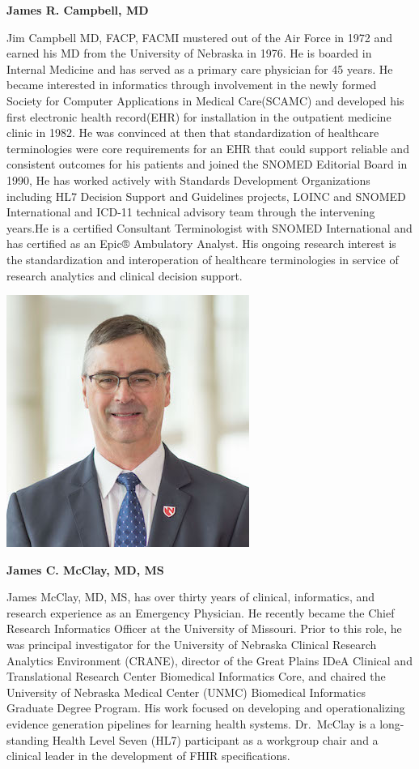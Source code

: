 \documentclass[
]{journal}
\begin{document}
\textbf{James R. Campbell, MD}

Jim Campbell MD, FACP, FACMI mustered out of the Air Force in 1972 and earned his MD from the University of Nebraska in 1976. He is boarded in Internal Medicine and has served as a primary care physician for 45 years. He became interested in informatics through involvement in the newly formed Society for Computer Applications in Medical Care(SCAMC) and developed his first electronic health record(EHR) for installation in the outpatient medicine clinic in 1982. He was convinced at then that standardization of healthcare terminologies were core requirements for an EHR that could support reliable and consistent outcomes for his patients and joined the SNOMED Editorial Board in 1990, He has worked actively with Standards Development Organizations including HL7 Decision Support and Guidelines projects, LOINC and SNOMED International and ICD-11 technical advisory team through the intervening years.He is a certified Consultant Terminologist with SNOMED International and has certified as an Epic® Ambulatory Analyst. His ongoing research interest is the standardization and interoperation of healthcare terminologies in service of research analytics and clinical decision support.

\begin{flushleft}\includegraphics[width=0.5\linewidth]{assets/biography/jim_mcclay} \end{flushleft}

\textbf{James C. McClay, MD, MS}

James McClay, MD, MS, has over thirty years of clinical, informatics, and research experience as an Emergency Physician. He recently became the Chief Research Informatics Officer at the University of Missouri. Prior to this role, he was principal investigator for the University of Nebraska Clinical Research Analytics Environment (CRANE), director of the Great Plains IDeA Clinical and Translational Research Center Biomedical Informatics Core, and chaired the University of Nebraska Medical Center (UNMC) Biomedical Informatics Graduate Degree Program. His work focused on developing and operationalizing evidence generation pipelines for learning health systems. Dr.~McClay is a long-standing Health Level Seven (HL7) participant as a workgroup chair and a clinical leader in the development of FHIR specifications.
\end{document}
